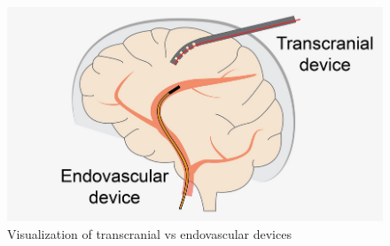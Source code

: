 \begin{figure} [H]
    \centering
    \includegraphics[width=0.8\linewidth]{images/brain surgery/43577_2023_644_Figa_HTML.png}
    \caption{Visualization of transcranial vs endovascular devices}
    \label{fig:transcranialvsendocascular}
\end{figure}

